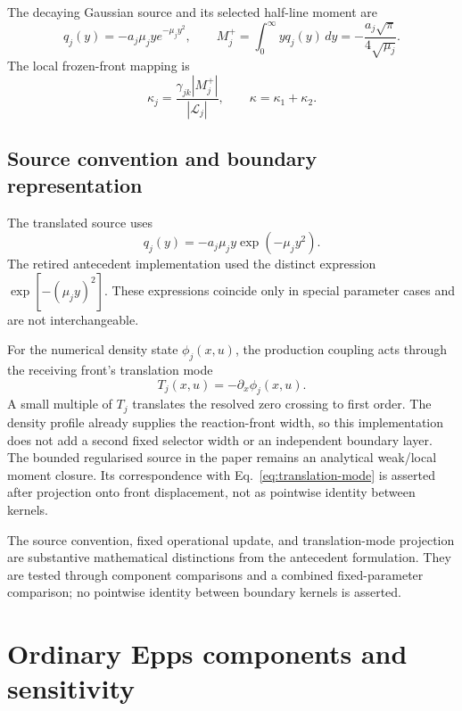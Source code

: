 \documentclass[11pt]{article}
\begin{document}
The decaying Gaussian source and its selected half-line moment are
\begin{equation}
q_j(y)=-a_j\mu_j y e^{-\mu_jy^2},
\qquad
M_j^+=\int_0^\infty yq_j(y)\,dy
=-\frac{a_j\sqrt\pi}{4\sqrt{\mu_j}}.
\label{eq:moment}
\end{equation}
The local frozen-front mapping is
\begin{equation}
\kappa_j=\frac{\gamma_{jk}|M_j^+|}{|\mathcal L_j|},
\qquad
\kappa=\kappa_1+\kappa_2.
\label{eq:response}
\end{equation}

\subsection{Source convention and boundary representation}

The translated source uses
\begin{equation}
q_j(y)=-a_j\mu_j y\exp(-\mu_j y^2).
\end{equation}
The retired antecedent implementation used the distinct expression
\(\exp[-(\mu_j y)^2]\). These expressions coincide only in special parameter
cases and are not interchangeable.

For the numerical density state \(\phi_j(x,u)\), the production coupling acts
through the receiving front's translation mode
\begin{equation}
T_j(x,u)=-\partial_x\phi_j(x,u).
\label{eq:translation-mode}
\end{equation}
A small multiple of \(T_j\) translates the resolved zero crossing to first
order. The density profile already supplies the reaction-front width, so this
implementation does not add a second fixed selector width or an independent
boundary layer. The bounded regularised source in the paper remains an
analytical weak/local moment closure. Its correspondence with
Eq.~\eqref{eq:translation-mode} is asserted after projection onto front
displacement, not as pointwise identity between kernels.

The source convention, fixed operational update, and translation-mode projection are substantive mathematical distinctions from the antecedent formulation. They are tested through component comparisons and a combined fixed-parameter comparison; no pointwise identity between boundary kernels is asserted.

\section{Ordinary Epps components and sensitivity}
\end{document}
